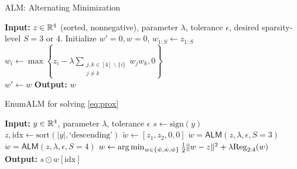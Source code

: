\begin{algorithm}
\caption{\textsf{ALM}: Alternating Minimization}\label{alg:alm}
\begin{algorithmic}[1]
\State \textbf{Input:} $z\in \mathbb{R}^4$ (sorted, nonnegative), parameter $\lambda$, tolerance $\epsilon$, desired sparsity-level $S=3 \text{ or } 4$.%
\State Initialize $w'=0, w=0$, 
\State $w_{1:S}  \leftarrow z_{1:S}$
            \State 
            $w_i \leftarrow \max \left\{ z_i - \lambda \sum_{\substack{j,k\in[4]\backslash \{i\}\\j \neq k}} w_jw_k, 0 \right\}$ \\
        \EndFor
        \State $w' \leftarrow w$
    \EndWhile
\State  \textbf{Output:} $w$
\end{algorithmic}
\end{algorithm}
\begin{algorithm}
\caption{\textsf{EnumALM} for solving \eqref{eq:prox}}\label{alg:enumALM}
\begin{algorithmic}[1]
    \State \textbf{Input:} $y\in \mathbb{R}^4$, parameter $\lambda$, tolerance $\epsilon$
    \State $s \leftarrow \mathrm{sign}(y) $ 
    \State $z, \textrm{idx} \leftarrow  \mathrm{sort}(|y|,\text{`descending'})$  
    \State $\tilde{w} \leftarrow [z_1,z_2, 0, 0]$ 
      \State $\dot{w} = \textsf{ALM}(z,\lambda,\epsilon, S=3)$ 
      \State $\ddot{w} = \textsf{ALM}(z,\lambda,\epsilon, S=4)$ 
      \State $w \leftarrow \operatorname*{arg\,min}_{w\in\{\tilde{w},\dot{w},\ddot{w}\}}\frac{1}{2}\|w-z\|^2 + \lambda \mathrm{Reg}_{2:4}(w)$
    \State \textbf{Output:}  $s\odot w[\textrm{idx}]$  
    \end{algorithmic}
\end{algorithm}




